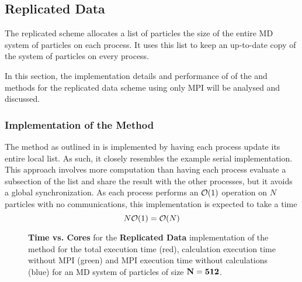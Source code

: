\subsection{Replicated Data}

The replicated scheme allocates a list of particles the size of
the entire MD system of particles
on each process.
%
It uses this list to keep an up-to-date copy of the system of particles
on every process.

In this section, the implementation details and performance of
of the \individualoperation{} and \pairoperation{} methods
for the replicated data scheme using only MPI will be analysed and discussed.


%
%

\subsubsection{Implementation of the \individualoperation{} Method}

The \individualoperation{} method as outlined in
is implemented by having each process update its entire local list.
%
As such, it closely resembles the example serial implementation.
%
This approach involves more computation than having each process
evaluate a subsection of the list and share the result with the
other processes, but it avoids a global synchronization.
%
As each process performs an $\mathcal{O}{\left({ 1 }\right)}$ operation on $N$ particles with
no communications,
this implementation is expected to take a time
\begin{equation}
\label{eqn:v0_replicated_individual_operation_overall_time}
    N\mathcal{O}{\left({ 1 }\right)} = \mathcal{O}{\left({ N }\right)}
\end  {equation}

\newcommand{\vZeroTimeCaption}[3]{
    {\bf Time vs. Cores} for the {\bf #1} implementation of the
    {\bf #2} method for the total execution time (red),
    calculation execution time without MPI (green) and
    MPI execution time without calculations (blue)
    for an MD system of particles of size ${\bf N = {#3}}$.
}

\begin{figure}[!h]
    
    \caption{\vZeroTimeCaption{Replicated Data}{\individualoperation{}}{512}}
    \label{fig:v0_replicated_individual_operation_512_time}
\end  {figure}

